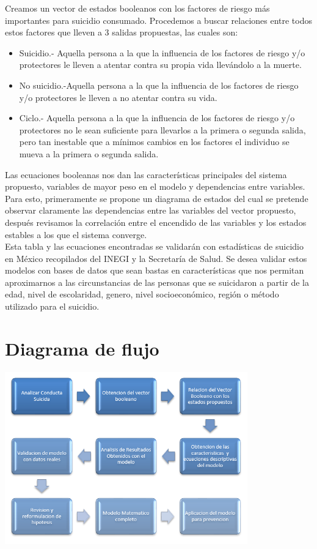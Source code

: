 {{{{{Creamos un vector de estados booleanos con los factores de riesgo más importantes para suicidio consumado. Procedemos a buscar relaciones entre todos estos factores que lleven a 3 salidas propuestas, las cuales son:
\begin{itemize}
\item Suicidio.- Aquella persona a la que la influencia de los factores de riesgo y/o protectores le lleven a atentar contra su propia vida llevándolo a la muerte.
\item No suicidio.-Aquella persona a la que la influencia de los factores de riesgo y/o protectores le lleven a no atentar contra su vida.
\item Ciclo.- Aquella persona a la que la influencia de los factores de riesgo y/o protectores no le sean suficiente para llevarlos a la primera o segunda salida, pero tan inestable que a mínimos cambios en los factores el individuo se mueva a la primera o segunda salida.
\end{itemize}

Las ecuaciones booleanas nos dan las características principales del sistema propuesto, variables de mayor peso en el modelo y dependencias entre variables. Para esto, primeramente se propone un diagrama de estados del cual se pretende observar claramente las dependencias entre las variables del vector propuesto, después revisamos la correlación entre el encendido de las variables y los estados estables a los que el sistema converge.\\

Esta tabla y las ecuaciones encontradas se validarán con estadísticas de suicidio en México recopilados del INEGI y la Secretaría de Salud. Se desea validar estos modelos con bases de datos que sean bastas en características que nos permitan aproximarnos a las circunstancias de las personas que se suicidaron a partir de la edad, nivel de escolaridad, genero, nivel socioeconómico, región o método utilizado para el suicidio. \\

}
\section{Diagrama de flujo}
{
\begin{center}
\includegraphics[width=10.5cm]{imagenes/1-suicidio/diagrama1.png}
\end{center}
}
}}}}

